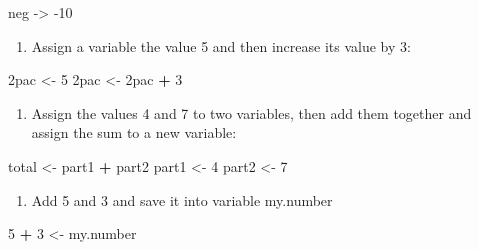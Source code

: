 \documentclass[
]{book}
\newenvironment{Shaded}{\begin{snugshade}}{\end{snugshade}}
\newcommand{\DecValTok}[1]{\textcolor[rgb]{0.00,0.00,0.81}{#1}}
\newcommand{\NormalTok}[1]{#1}
\newcommand{\OperatorTok}[1]{\textcolor[rgb]{0.81,0.36,0.00}{\textbf{#1}}}
\newcommand{\StringTok}[1]{\textcolor[rgb]{0.31,0.60,0.02}{#1}}
\providecommand{\tightlist}{%
  \setlength{\itemsep}{0pt}\setlength{\parskip}{0pt}}
\theoremstyle{definition}
\theoremstyle{definition}
\theoremstyle{definition}
\theoremstyle{remark}
\begin{document}
\begin{Shaded}
\begin{Highlighting}[]
\NormalTok{neg {-}\textgreater{}}\StringTok{ }\DecValTok{{-}10}
\end{Highlighting}
\end{Shaded}

\begin{enumerate}
\def\labelenumi{\arabic{enumi}.}
\setcounter{enumi}{1}
\tightlist
\item
  Assign a variable the value 5 and then increase its value by 3:
\end{enumerate}

\begin{Shaded}
\begin{Highlighting}[]
\NormalTok{2pac \textless{}{-}}\StringTok{ }\DecValTok{5}
\NormalTok{2pac \textless{}{-}}\StringTok{ }\NormalTok{2pac }\OperatorTok{+}\StringTok{ }\DecValTok{3}
\end{Highlighting}
\end{Shaded}

\begin{enumerate}
\def\labelenumi{\arabic{enumi}.}
\setcounter{enumi}{2}
\tightlist
\item
  Assign the values 4 and 7 to two variables, then add them together and assign the sum to a new variable:
\end{enumerate}

\begin{Shaded}
\begin{Highlighting}[]
\NormalTok{total \textless{}{-}}\StringTok{ }\NormalTok{part1 }\OperatorTok{+}\StringTok{ }\NormalTok{part2}
\NormalTok{part1 \textless{}{-}}\StringTok{ }\DecValTok{4}
\NormalTok{part2 \textless{}{-}}\StringTok{ }\DecValTok{7}
\end{Highlighting}
\end{Shaded}

\begin{enumerate}
\def\labelenumi{\arabic{enumi}.}
\setcounter{enumi}{3}
\tightlist
\item
  Add 5 and 3 and save it into variable my.number
\end{enumerate}

\begin{Shaded}
\begin{Highlighting}[]
\DecValTok{5} \OperatorTok{+}\StringTok{ }\DecValTok{3}\NormalTok{ \textless{}{-}}\StringTok{ }\NormalTok{my.number}
\end{Highlighting}
\end{Shaded}
\end{document}
